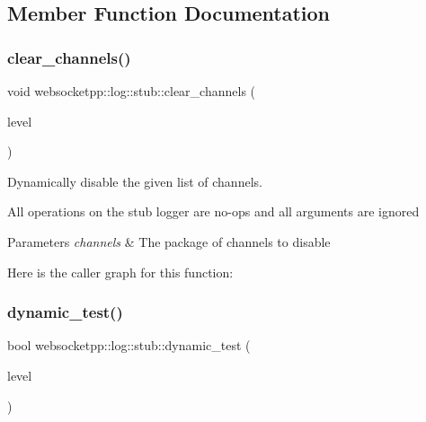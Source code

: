 \subsection{Member Function Documentation}
\mbox{\label{classwebsocketpp_1_1log_1_1stub_af4bea37fd436439b0ab19238b2c47d15}} 
\subsubsection{\texorpdfstring{clear\+\_\+channels()}{clear\_channels()}}
{\footnotesize\ttfamily void websocketpp\+::log\+::stub\+::clear\+\_\+channels (\begin{DoxyParamCaption}\item[{level}]{ }\end{DoxyParamCaption})\hspace{0.3cm}{\ttfamily [inline]}}



Dynamically disable the given list of channels. 

All operations on the stub logger are no-\/ops and all arguments are ignored


\begin{DoxyParams}{Parameters}
{\em channels} & The package of channels to disable \\
\hline
\end{DoxyParams}
Here is the caller graph for this function\+:
\mbox{\label{classwebsocketpp_1_1log_1_1stub_ada729613ea1f62a71f47a4736978b096}} 
\subsubsection{\texorpdfstring{dynamic\+\_\+test()}{dynamic\_test()}}
{\footnotesize\ttfamily bool websocketpp\+::log\+::stub\+::dynamic\+\_\+test (\begin{DoxyParamCaption}\item[{level}]{ }\end{DoxyParamCaption})\hspace{0.3cm}{\ttfamily [inline]}}




